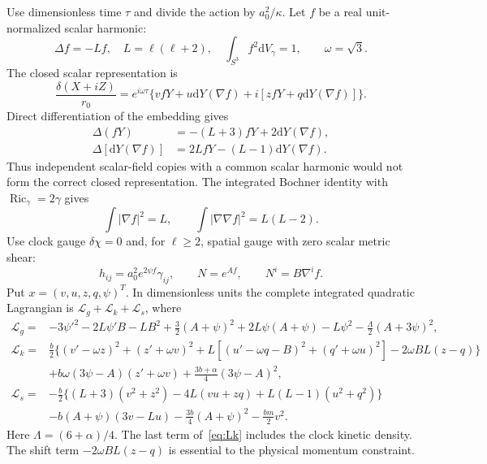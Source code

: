 \documentclass[11pt]{article}
\newcommand{\dd}{\mathrm d}
\numberwithin{equation}{section}
\begin{document}
Use dimensionless time $\tau$ and divide the action by $a_0^2/\kappa$.
Let $f$ be a real unit-normalized scalar harmonic:
\begin{equation}
 \Delta f=-Lf,\quad L=\ell(\ell+2),\quad
 \int_{S^3}f^2\dd V_\gamma=1,\qquad\omega=\sqrt3.
\end{equation}
The closed scalar representation is
\begin{equation}
 \frac{\delta(X+iZ)}{r_0}=e^{i\omega\tau}
 \{vfY+u\dd Y(\nabla f)+i[zfY+q\dd Y(\nabla f)]\}.
 \label{eq:basis}
\end{equation}
Direct differentiation of the embedding gives
\begin{align}
 \Delta(fY)&=-(L+3)fY+2\dd Y(\nabla f),\\
 \Delta[\dd Y(\nabla f)]&=2LfY-(L-1)\dd Y(\nabla f).
\end{align}
Thus independent scalar-field copies with a common scalar harmonic would not form the correct closed representation.
The integrated Bochner identity with $\operatorname{Ric}_\gamma=2\gamma$ gives
\begin{equation}
 \int|\nabla f|^2=L,\qquad \int|\nabla\nabla f|^2=L(L-2).
 \label{eq:bochner}
\end{equation}
Use clock gauge $\delta\chi=0$ and, for $\ell\ge2$, spatial gauge with zero scalar metric shear:
\begin{equation}
 h_{ij}=a_0^2e^{2\psi f}\gamma_{ij},\qquad N=e^{Af},\qquad N^i=B\nabla^if.
\end{equation}
Put $x=(v,u,z,q,\psi)^T$.
In dimensionless units the complete integrated quadratic Lagrangian is $\mathcal L_g+\mathcal L_k+\mathcal L_s$, where
\begin{align}
 \mathcal L_g={}&-3\psi'^2-2L\psi'B-LB^2+\tfrac32(A+\psi)^2
 +2L\psi(A+\psi)-L\psi^2-\tfrac\Lambda2(A+3\psi)^2,\label{eq:Lg}\\
 \mathcal L_k={}&\tfrac b2\{(v'-\omega z)^2+(z'+\omega v)^2
 +L[(u'-\omega q-B)^2+(q'+\omega u)^2]-2\omega BL(z-q)\}\nonumber\\
 &+b\omega(3\psi-A)(z'+\omega v)+\tfrac{3b+\alpha}{4}(3\psi-A)^2,\label{eq:Lk}\\
 \mathcal L_s={}&-\tfrac b2\{(L+3)(v^2+z^2)-4L(vu+zq)+L(L-1)(u^2+q^2)\}
 \nonumber\\&-b(A+\psi)(3v-Lu)-\tfrac{3b}{4}(A+\psi)^2-\tfrac{bm}{2}v^2.
 \label{eq:Ls}
\end{align}
Here $\Lambda=(6+\alpha)/4$.
The last term of~\eqref{eq:Lk} includes the clock kinetic density.
The shift term $-2\omega BL(z-q)$ is essential to the physical momentum constraint.
\end{document}
